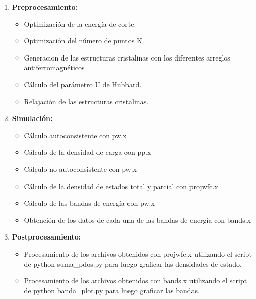 \begin{enumerate}
    \item \textbf{Preprocesamiento:}
    \begin{itemize}
        \item Optimizaci\'on de la energ\'ia de corte.
        \item Optimizaci\'on del n\'umero de puntos K.
        \item Generacion de las estructuras cristalinas con los diferentes 
        arreglos antiferromagn\'eticos
        \item C\'alculo del par\'ametro U de Hubbard.
        \item Relajaci\'on de las estructuras cristalinas.
    \end{itemize}
    \item \textbf{Simulaci\'on:}
    \begin{itemize}
        \item C\'alculo autoconsistente con pw.x
        \item C\'alculo de la densidad de carga con pp.x
        \item C\'alculo no autoconsistente con pw.x
        \item C\'alculo de la densidad de estados total y parcial con 
        projwfc.x
        \item C\'alculo de las bandas de energ\'ia con pw.x
        \item Obtenci\'on de los datos de cada una de las bandas de 
        energ\'ia con bands.x
    \end{itemize}
    \item \textbf{Postprocesamiento:}
    \begin{itemize}
        \item Procesamiento de los archivos obtenidos con projwfc.x 
        utilizando el script de python suma\_pdos.py para luego graficar 
        las densidades de estado.
        \item Procesamiento de los archivos obtenidos con bands.x 
        utilizando el script de python banda\_plot.py para luego graficar 
        las bandas.
    \end{itemize}
\end{enumerate}

